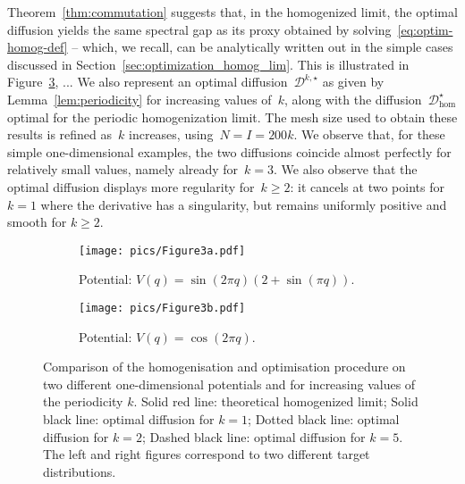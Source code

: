 \documentclass{article}
\renewcommand{\geq}{\geqslant}
\newcommand{\Diff}{\mathcal{D}}
\begin{document}
Theorem~\ref{thm:commutation} suggests that, in the homogenized limit, the optimal diffusion yields the same spectral gap as its proxy obtained by solving~\eqref{eq:optim-homog-def} -- which, we recall, can be analytically written out in the simple cases discussed in Section~\ref{sec:optimization_homog_lim}. This is illustrated in Figure~\ref{fig:homogenization-pic}, ... We also represent an optimal diffusion~$\Diff^{k,\star}$ as given by Lemma~\ref{lem:periodicity} for increasing values of~$k$, along with the diffusion~$\Diff^\star_\mathrm{hom}$ optimal for the periodic homogenization limit.
The mesh size used to obtain these results is refined as~$k$ increases, using~$N = I = 200k$. We observe that, for these simple one-dimensional examples, the two diffusions coincide almost perfectly for relatively small values, namely already for~$k=3$. We also observe that the optimal diffusion displays more regularity for~$k \geq 2$: it cancels at two points for $k=1$ where the derivative has a singularity, but remains uniformly positive and smooth for $k \geq 2$.

\begin{figure}
\centering
\begin{subfigure}[t]{0.49\linewidth}
\texttt{[image: pics/Figure3a.pdf]}
\caption{Potential: $V(q) =   \sin(2\pi q) (2 + \sin(\pi q))$.}
\label{fig:homog-a}
\end{subfigure}
\hfill
\begin{subfigure}[t]{0.49\linewidth}
\texttt{[image: pics/Figure3b.pdf]}
\caption{Potential: $V(q) =   \cos(2\pi q)$. }
\label{fig:homog-b}
\end{subfigure}
\caption{Comparison of the homogenisation and optimisation procedure on two different one-dimensional potentials and for increasing values of the periodicity $k$. Solid red line: theoretical homogenized limit; Solid black line: optimal diffusion for $k=1$; Dotted black line: optimal diffusion for $k=2$; Dashed black line: optimal diffusion for $k=5$. The left and right figures correspond to two different target distributions.}
\label{fig:homogenization-pic}
\end{figure}
\end{document}
